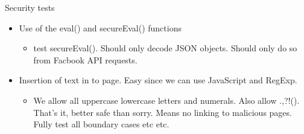     Security tests
    
    \begin{itemize}
    
    \item Use of the eval() and secureEval() functions
    \begin{itemize}
        \item test secureEval(). Should only decode JSON objects. Should only do so from Facbook API requests.
    \end{itemize}
    
    \item Insertion of text in to page. Easy since we can use JavaScript and RegExp.
    \begin{itemize}
        \item We allow all uppercase lowercase letters and numerals. Also allow .,?!(). That's it, better safe than sorry. Means no linking to malicious pages. Fully test all boundary cases etc etc.
    \end{itemize}
    

\end{itemize}
